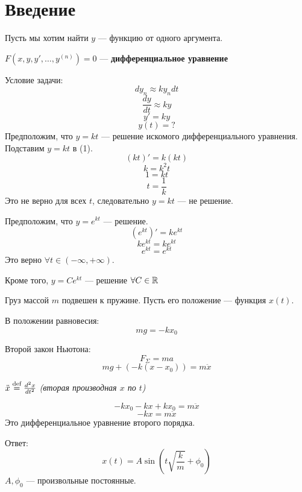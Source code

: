 

\cfoot{}

\setcounter{section}{-1}



\section{Введение}

Пусть мы хотим найти $y$ --- функцию от одного аргумента.

\begin{definition}
    $F(x, y, y', \ldots, y^{(n)}) = 0$ --- \textbf{дифференциальное уравнение}
\end{definition}

\begin{example}
    Условие задачи:
    $$d y_n \approx k y_n d t$$
    $$\frac{d y}{d t} \approx ky$$
    \begin{equation}
        y' = ky
    \end{equation}
    $$y(t) = ?$$
    Предположим, что $y=kt$ --- решение искомого дифференциального уравнения. Подставим $y=kt$ в (1).
    $$(kt)' = k (kt)$$
    $$k = k^2t$$
    $$1 = kt$$
    $$t = \frac{1}{k}$$
    Это не верно для всех $t$, следовательно $y=kt$ --- не решение.

    Предположим, что $y=e^{kt}$ --- решение.
    $$(e^{kt})' = ke^{kt}$$
    $$ke^{kt} = ke^{kt}$$
    $$e^{kt} = e^{kt}$$
    Это верно $\forall t \in (-\infty, +\infty)$.

    Кроме того, $y=Ce^{kt}$ --- решение $\forall C\in\mathbb{R}$
\end{example}

\begin{example}
    Груз массой $m$ подвешен к пружине. Пусть его положение --- функция $x(t)$.

    В положении равновесия:
    $$mg = -kx_0$$

    Второй закон Ньютона:
    $$F_\Sigma = ma$$
    $$mg + (-k(x-x_0))= m \ddot x$$
    \begin{remark}
        $\ddot x \stackrel{\text{def}}{=} \frac{d^2 x}{d t^2}$ \textit{(вторая производная $x$ по $t$)}
    \end{remark}
    $$-kx_0 - kx + kx_0 = m\ddot x$$
    $$-kx = m\ddot x$$
    Это дифференциальное уравнение второго порядка.

    Ответ: $$x(t) = A \sin\left(t\sqrt{\frac{k}{m}} + \phi_0\right)$$
    $A, \phi_0$ --- произвольные постоянные.
\end{example}

